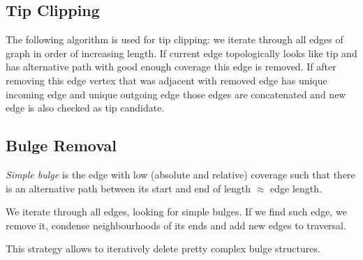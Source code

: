 \documentclass[12pt]{article}
\begin{document}
\subsection{Tip Clipping}

The following algorithm is used for tip clipping: we iterate through all edges of graph in order of increasing length. If current edge topologically looks like tip and has alternative path with good enough coverage this edge is removed. If after removing this edge vertex that was adjacent with removed edge has unique incoming edge and unique outgoing edge those edges are concatenated and new edge is also checked as tip candidate.

\subsection{Bulge Removal}
\textit{Simple bulge} is the edge with low (absolute and relative) coverage such that there is an alternative path between its start and end of length $\approx$ edge length.

We iterate through all edges, looking for simple bulges. If we find such edge, we remove it, condense neighbourhoods of its ends and add new edges to traversal.

This strategy allows to iteratively delete pretty complex bulge structures.
\end{document}

